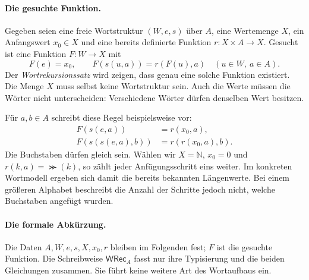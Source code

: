 \paragraph{Die gesuchte Funktion.}
Gegeben seien eine freie Wortstruktur \((W,e,s)\) über \(A\), eine
Wertemenge \(X\), ein Anfangswert \(x_0\in X\) und eine bereits
definierte Funktion \(r\colon X\times A\to X\). Gesucht ist eine
Funktion \(F\colon W\to X\) mit
\[
  F(e)=x_0,\qquad F(s(u,a))=r(F(u),a)
  \quad(u\in W,\ a\in A).
\]
Der \emph{Wortrekursionssatz} wird zeigen, dass genau eine solche
Funktion existiert. Die Menge \(X\) muss selbst keine Wortstruktur
sein. Auch die Werte müssen die Wörter nicht unterscheiden: Verschiedene
Wörter dürfen denselben Wert besitzen.

Für \(a,b\in A\) schreibt diese Regel beispielsweise vor:
\[
  \begin{aligned}
    F(s(e,a))&=r(x_0,a),\\[-2pt]
    F(s(s(e,a),b))&=r(r(x_0,a),b).
  \end{aligned}
\]
Die Buchstaben dürfen gleich sein. Wählen wir \(X=\mathbb N\),
\(x_0=0\) und \(r(k,a)=\Succ(k)\), so zählt jeder Anfügungsschritt
eins weiter. Im konkreten Wortmodell ergeben sich damit die bereits
bekannten Längenwerte. Bei einem größeren Alphabet beschreibt die
Anzahl der Schritte jedoch nicht, welche Buchstaben angefügt wurden.

\paragraph{Die formale Abkürzung.}
Die Daten \(A,W,e,s,X,x_0,r\) bleiben im Folgenden fest; \(F\) ist
die gesuchte Funktion. Die Schreibweise \(\mathsf{WRec}_A\) fasst
nur ihre Typisierung und die beiden Gleichungen zusammen. Sie führt
keine weitere Art des Wortaufbaus ein.


